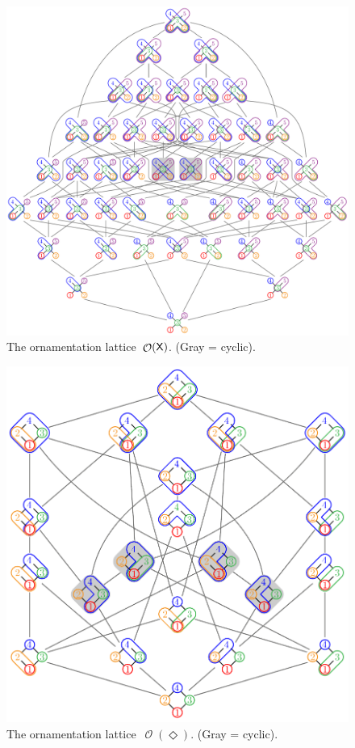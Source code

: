 \documentclass{amsart}
\theoremstyle{definition}
\renewcommand{\c}[1]{\mathcal{#1}} %
\DeclareMathOperator{\Orn}{\c{O}}  %
\newcommand{\Xgraph}{\sf X} %
\newcommand{\Dgraph}{\boldsymbol{\Diamond}} %
\begin{document}
\begin{figure}
	\centerline{\includegraphics[scale=.68]{ornamentationsX}}
	\caption{The ornamentation lattice~$\Orn(\Xgraph)$. (Gray = cyclic).}
	\label{fig:ornamentationsX}
\end{figure}

\begin{figure}
	\centerline{\includegraphics[scale=.68]{ornamentationsD}}
	\caption{The ornamentation lattice~$\Orn(\Dgraph)$. (Gray = cyclic).}
	\label{fig:ornamentationsD}
\end{figure}
\end{document}
